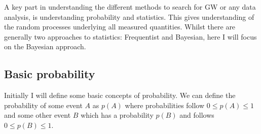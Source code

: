 A key part in understanding the different methods to search for \gls{GW} or any data analysis, is understanding probability and statistics. 
This gives understanding of the random processes underlying all measured quantities. 
Whilst there are generally two approaches to statistics: Frequentist and Bayesian, here I will focus on the Bayesian approach.  

\subsection{\label{intro:prob:basic}Basic probability}

Initially I will define some basic concepts of probability.
We can define the probability of some event $A$ as $p(A)$ where probabilities follow $0 \leq p(A) \leq 1$ and some other event $B$ which has a probability $p(B)$ and follows $0 \leq p(B) \leq 1$.

